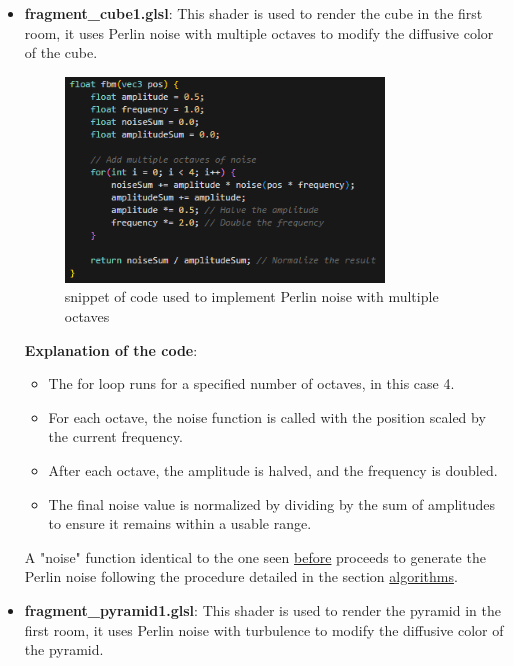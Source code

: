 \documentclass[12pt]{article}
\begin{document}
\begin{enumerate}
\begin{itemize}
        \item \textbf{fragment\_cube1.glsl}:
        \newline
        This shader is used to render the cube in the first room, it uses Perlin noise with multiple octaves to modify the diffusive color of the cube.

        \begin{figure}[H]
            \centering
            \includegraphics[width=0.8\textwidth]{Images/cube1code.png}
            \caption{snippet of code used to implement Perlin noise with multiple octaves}
        \end{figure}

        \textbf{Explanation of the code}:

        \begin{itemize}
            \item The for loop runs for a specified number of octaves, in this case 4.
            \item For each octave, the noise function is called with the position scaled by the current frequency.
            \item After each octave, the amplitude is halved, and the frequency is doubled.
            \item The final noise value is normalized by dividing by the sum of amplitudes to ensure it remains within a usable range.
        \end{itemize}

        A "noise" function identical to the one seen \hyperref[img:noiseFunction]{before} proceeds to generate the Perlin noise following the procedure detailed in the section \hyperref[sec:algorithms]{algorithms}.

    \newpage

        \item \textbf{fragment\_pyramid1.glsl}:
        \newline
        This shader is used to render the pyramid in the first room, it uses Perlin noise with turbulence to modify the diffusive color of the pyramid.


\end{itemize}
\end{enumerate}
\end{document}
